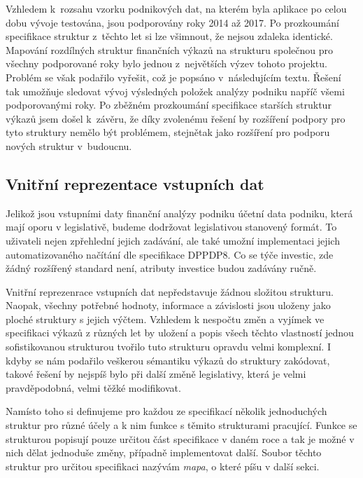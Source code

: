 Vzhledem k~rozsahu vzorku podnikových dat, na kterém byla aplikace po celou dobu vývoje testována, jsou podporovány roky 2014 až 2017. Po prozkoumání specifikace struktur z~těchto let si lze všimnout, že nejsou zdaleka identické. Mapování rozdílných struktur finančních výkazů na strukturu společnou pro všechny podporované roky bylo jednou z~největších výzev tohoto projektu. Problém se však podařilo vyřešit, což je popsáno v~následujícím textu. Řešení tak umožňuje sledovat vývoj výsledných položek analýzy podniku napříč všemi podporovanými roky. Po zběžném prozkoumání specifikace starších struktur výkazů jsem došel k~závěru, že díky zvolenému řešení by rozšíření podpory pro tyto struktury nemělo být problémem, stejnětak jako rozšíření pro podporu nových struktur v~budoucnu.

\subsection{Vnitřní reprezentace vstupních dat}
Jelikož jsou vstupními daty finanční analýzy podniku účetní data podniku, která mají oporu v legislativě, budeme dodržovat legislativou stanovený formát. To uživateli nejen zpřehlední jejich zadávání, ale také umožní implementaci jejich automatizovaného načítání dle specifikace DPPDP8. Co se týče investic, zde žádný rozšířený standard není, atributy investice budou zadávány ručně.

Vnitřní reprezenrace vstupních dat nepředstavuje žádnou složitou strukturu. Naopak, všechny potřebné hodnoty, informace a závislosti jsou uloženy jako ploché struktury s jejich výčtem. Vzhledem k nespočtu změn a vyjímek ve specifikaci výkazů z různých let by uložení a popis všech těchto vlastností jednou sofistikovanou strukturou tvořilo tuto strukturu opravdu velmi komplexní. I kdyby se nám podařilo veškerou sémantiku výkazů do struktury zakódovat, takové řešení by nejspíš bylo při další změně legislativy, která je velmi pravděpodobná, velmi těžké modifikovat.

Namísto toho si definujeme pro každou ze specifikací několik jednoduchých struktur pro různé účely a k nim funkce s těmito strukturami pracující. Funkce se strukturou popisují pouze určitou část specifikace v daném roce a tak je možné v nich dělat jednoduše změny, případně implementovat další. Soubor těchto struktur pro určitou specifikaci nazývám \textit{mapa}, o které píšu v další sekci.



